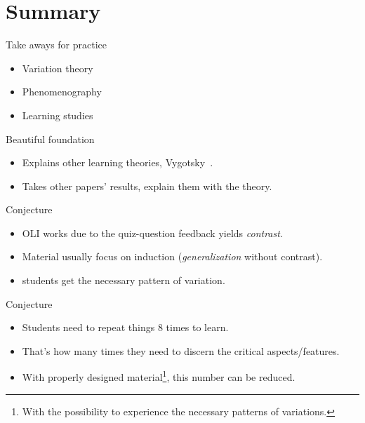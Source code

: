\section{Summary}

\begin{frame}
  \begin{block}{Take aways for practice}
    \begin{itemize}
      \item Variation theory
      \item Phenomenography
      \item Learning studies
    \end{itemize}
  \end{block}

  \begin{block}{Beautiful foundation}
    \begin{itemize}
      \item Explains other learning theories, \eg Vygotsky~\cite{Vygotsky}.
      \item Takes other papers' results, explain them with the theory.
    \end{itemize}
  \end{block}
\end{frame}

\begin{frame}
  \begin{alertblock}{Conjecture}
    \begin{itemize}
      \item OLI works due to the quiz-question feedback yields \emph{contrast}.
      \item Material usually focus on induction (\emph{generalization} without 
        contrast).
      \item \Ie students get the necessary pattern of variation.
    \end{itemize}
  \end{alertblock}
\end{frame}

\begin{frame}
  \begin{alertblock}{Conjecture}
    \begin{itemize}
      \item Students need to repeat things 8 times to learn.
      \item That's how many times they need to discern the critical 
        aspects/features.
      \item With properly designed material\footnote{%
          With the possibility to experience the necessary patterns of 
          variations.
        }, this number can be reduced.
    \end{itemize}
  \end{alertblock}
\end{frame}

